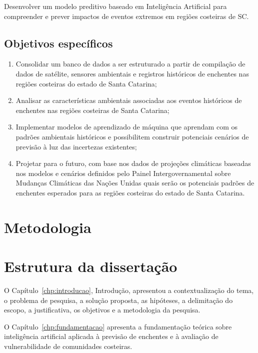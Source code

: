 Desenvolver um modelo preditivo baseado em Inteligência Artificial para compreender e prever impactos de eventos extremos em regiões costeiras de SC.

\subsection{Objetivos específicos}
\label{sec:objetivos-especificos}

\begin{enumerate}
  \item Consolidar um banco de dados a ser estruturado a partir de compilação de dados de satélite, sensores ambientais e registros históricos de enchentes nas regiões costeiras do estado de Santa Catarina;
  \item Analisar as características ambientais associadas aos eventos históricos de enchentes nas regiões costeiras de Santa Catarina;
  \item Implementar modelos de aprendizado de máquina que aprendam com os padrões ambientais históricos e possibilitem construir potenciais cenários de previsão à luz das incertezas existentes;
  \item Projetar para o futuro, com base nos dados de projeções climáticas baseadas nos modelos e cenários definidos pelo Painel Intergovernamental sobre Mudanças Climáticas das Nações Unidas quais serão os potenciais padrões de enchentes esperados para as regiões costeiras do estado de Santa Catarina.
\end{enumerate}

\section{Metodologia}
\label{sec:metodologia}



\section{Estrutura da dissertação}
\label{sec:estrutura}

O Capítulo~\ref{chp:introducao}, Introdução, apresentou a contextualização do tema, o problema de pesquisa, a solução proposta, as hipóteses, a delimitação do escopo, a justificativa, os objetivos e a metodologia da pesquisa.

O Capítulo~\ref{chp:fundamentacao} apresenta a fundamentação teórica sobre inteligência artificial aplicada à previsão de enchentes e à avaliação de vulnerabilidade de comunidades costeiras.

